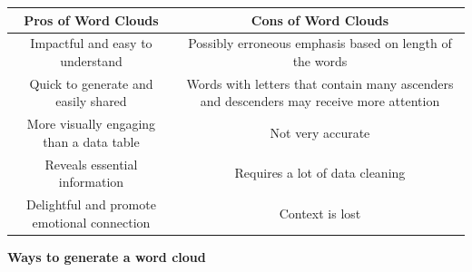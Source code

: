 \documentclass[]{book}
\begin{document}
\begin{longtable}[]{@{}cc@{}}
\toprule
\begin{minipage}[b]{0.46\columnwidth}\centering
\textbf{Pros of Word Clouds}\strut
\end{minipage} & \begin{minipage}[b]{0.48\columnwidth}\centering
\textbf{Cons of Word Clouds}\strut
\end{minipage}\tabularnewline
\midrule
\endhead
\begin{minipage}[t]{0.46\columnwidth}\centering
Impactful and easy to understand\strut
\end{minipage} & \begin{minipage}[t]{0.48\columnwidth}\centering
Possibly erroneous emphasis based on length of the words\strut
\end{minipage}\tabularnewline
\begin{minipage}[t]{0.46\columnwidth}\centering
Quick to generate and easily shared\strut
\end{minipage} & \begin{minipage}[t]{0.48\columnwidth}\centering
Words with letters that contain many ascenders and descenders may receive more attention\strut
\end{minipage}\tabularnewline
\begin{minipage}[t]{0.46\columnwidth}\centering
More visually engaging than a data table\strut
\end{minipage} & \begin{minipage}[t]{0.48\columnwidth}\centering
Not very accurate\strut
\end{minipage}\tabularnewline
\begin{minipage}[t]{0.46\columnwidth}\centering
Reveals essential information\strut
\end{minipage} & \begin{minipage}[t]{0.48\columnwidth}\centering
Requires a lot of data cleaning\strut
\end{minipage}\tabularnewline
\begin{minipage}[t]{0.46\columnwidth}\centering
Delightful and promote emotional connection\strut
\end{minipage} & \begin{minipage}[t]{0.48\columnwidth}\centering
Context is lost\strut
\end{minipage}\tabularnewline
\bottomrule
\end{longtable}

\textbf{Ways to generate a word cloud}
\end{document}
